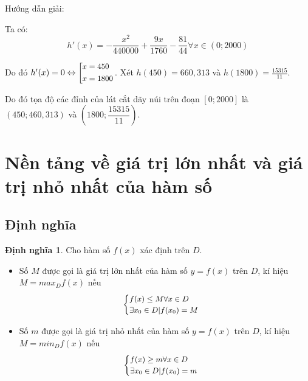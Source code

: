 \documentclass[12pt,a4paper,oneside]{book}
\theoremstyle{theorem}
\theoremstyle{definition}
\newtheorem{dn}[theorem2]{Định nghĩa}
\begin{document}
        Hướng dẫn giải:
        
        Ta có:
        $$h'(x)=- \frac{x^2}{440000}+ \frac{9x}{1760}- \frac{81}{44} \forall x \in (0;2000)$$

        Do đó $h'(x)=0 \Leftrightarrow 
            \left[
            \small \begin{aligned}
            x &= 450\\
            x &= 1800
            \end{aligned} 
            \right.
        $.
        Xét $h(450)=660,313$ và $h(1800)= \frac{15315}{11}$. 

        Do đó tọa độ các đỉnh của lát cắt dãy núi trên đoạn $[0;2000]$ là $(450;460,313)$ và $(1800; \dfrac{15315}{11})$.
    \section{Nền tảng về giá trị lớn nhất và giá trị nhỏ nhất của hàm số}
    \subsection{Định nghĩa}
        \begin{dn}
        Cho hàm số $f(x)$ xác định trên $D$.
        \end{dn}
        \begin{itemize}
            \item[(i)] Số $M$ được gọi là giá trị lớn nhất của hàm số $y=f(x)$ trên $D$, kí hiệu $M=max_Df(x)$ nếu
                \[
                \small \begin{cases}
                f(x) \leq M \forall x \in D\\
                \exists x_0 \in D| f(x_0)=M
                \end{cases}
                \]
            \item[(ii)] Số $m$ được gọi là giá trị nhỏ nhất của hàm số $y=f(x)$ trên $D$, kí hiệu $M=min_Df(x)$ nếu
                \[
                \small \begin{cases}
                f(x) \geq m \forall x \in D\\
                \exists x_0 \in D| f(x_0)=m
                \end{cases}
                \]
        \end{itemize}
\end{document}
